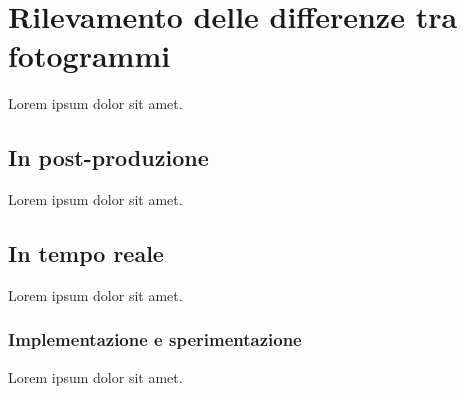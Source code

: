 \chapter{Rilevamento delle differenze tra fotogrammi}
\label{cha:diff}
Lorem ipsum dolor sit amet.

\section{In post-produzione}
\label{sec:diff_postprod}

Lorem ipsum dolor sit amet.

\section{In tempo reale}
\label{sec:diff_realtime}

Lorem ipsum dolor sit amet.

\subsection{Implementazione e sperimentazione}
\label{sec:diff_realtime_impl}

Lorem ipsum dolor sit amet.

